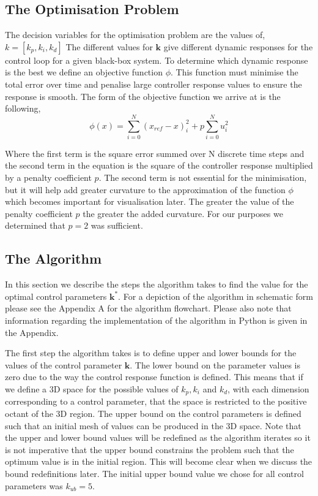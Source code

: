 \documentclass[conference]{IEEEtran}
\theoremstyle{definition}
\begin{document}
\subsection{The Optimisation Problem}
\noindent The decision variables for the optimisation problem are the values of, $k=[k_p,k_i,k_d]$ The different values for $\mathbf{k}$ give different dynamic responses for the control loop for a given black-box system. To determine which dynamic response is the best we define an objective function $\phi$. This function must minimise the total error over time and penalise large controller response values to ensure the response is smooth. The form of the objective function we arrive at is the following,
\begin{equation}
    \phi(x) = \sum_{i=0}^{N}(x_{ref} - x)^2_i + p\sum_{i=0}^{N}u_i^2
\end{equation}

\noindent Where the first term is the square error summed over N discrete time steps and the second term in the equation is the square of the controller response multiplied by a penalty coefficient $p$. The second term is not essential for the minimisation, but it will help add greater curvature to the approximation of the function $\phi$ which becomes important for visualisation later. The greater the value of the penalty coefficient $p$ the greater the added curvature. For our purposes we determined that $p=2$ was sufficient.

\subsection{The Algorithm}
\noindent In this section we describe the steps the algorithm takes to find the value for the optimal control parameters $\mathbf{k}^*$. For a depiction of the algorithm in schematic form please see the Appendix A for the algorithm flowchart. Please also note that information regarding the implementation of the algorithm in Python is given in the Appendix.

\noindent The first step the algorithm takes is to define upper and lower bounds for the values of the control parameter $\mathbf{k}$. The lower bound on the parameter values is zero due to the way the control response function is defined. This means that if we define a 3D space for the possible values of $k_p, k_i$ and $k_d$, with each dimension corresponding to a control parameter, that the space is restricted to the positive octant of the 3D region. The upper bound on the control parameters is defined such that an initial mesh of values can be produced in the 3D space. Note that the upper and lower bound values will be redefined as the algorithm iterates so it is not imperative that the upper bound constrains the problem such that the optimum value is in the initial region. This will become clear when we discuss the bound redefinitions later. The initial upper bound value we chose for all control parameters was $k_{ub}=5$.
\end{document}
